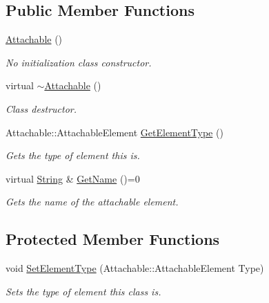 \subsection*{Public Member Functions}
\begin{DoxyCompactItemize}
\item 
\hypertarget{classphys_1_1Attachable_a93c18f22769a1f70ae300fc2c58210eb}{
\hyperlink{classphys_1_1Attachable_a93c18f22769a1f70ae300fc2c58210eb}{Attachable} ()}
\label{df/dbd/classphys_1_1Attachable_a93c18f22769a1f70ae300fc2c58210eb}

\begin{DoxyCompactList}\small\item\em No initialization class constructor. \item\end{DoxyCompactList}\item 
\hypertarget{classphys_1_1Attachable_af7187e29053b7fe339634394883729d4}{
virtual \hyperlink{classphys_1_1Attachable_af7187e29053b7fe339634394883729d4}{$\sim$Attachable} ()}
\label{df/dbd/classphys_1_1Attachable_af7187e29053b7fe339634394883729d4}

\begin{DoxyCompactList}\small\item\em Class destructor. \item\end{DoxyCompactList}\item 
Attachable::AttachableElement \hyperlink{classphys_1_1Attachable_a5f747000367afd85dfaff3a37976e74c}{GetElementType} ()
\begin{DoxyCompactList}\small\item\em Gets the type of element this is. \item\end{DoxyCompactList}\item 
\hypertarget{classphys_1_1Attachable_ad1a9bbd300fe21c5cc7e5aa7e2c95b85}{
virtual \hyperlink{namespacephys_aa03900411993de7fbfec4789bc1d392e}{String} \& \hyperlink{classphys_1_1Attachable_ad1a9bbd300fe21c5cc7e5aa7e2c95b85}{GetName} ()=0}
\label{df/dbd/classphys_1_1Attachable_ad1a9bbd300fe21c5cc7e5aa7e2c95b85}

\begin{DoxyCompactList}\small\item\em Gets the name of the attachable element. \item\end{DoxyCompactList}\end{DoxyCompactItemize}
\subsection*{Protected Member Functions}
\begin{DoxyCompactItemize}
\item 
void \hyperlink{classphys_1_1Attachable_a74361315eba9e4f0ce288518c92541fa}{SetElementType} (Attachable::AttachableElement Type)
\begin{DoxyCompactList}\small\item\em Sets the type of element this class is. \item\end{DoxyCompactList}\end{DoxyCompactItemize}
